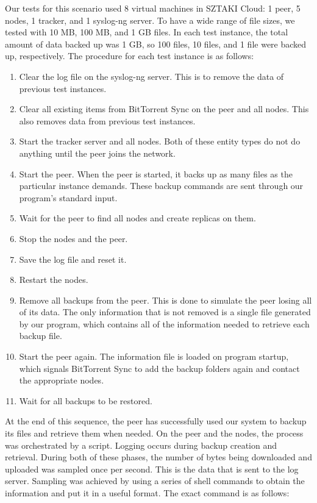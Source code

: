 \documentclass[12pt]{report}
\begin{document}
Our tests for this scenario used 8 virtual machines in SZTAKI Cloud: 1 peer, 5 nodes, 1 tracker, and 1 syslog-ng server. To have a wide range of file sizes, we tested with 10 MB, 100 MB, and 1 GB files. In each test instance, the total amount of data backed up was 1 GB, so 100 files, 10 files, and 1 file were backed up, respectively. The procedure for each test instance is as follows:

\begin{enumerate}
  \item Clear the log file on the syslog-ng server. This is to remove the data of previous test instances.
  \item Clear all existing items from BitTorrent Sync on the peer and all nodes. This also removes data from previous test instances.
  \item Start the tracker server and all nodes. Both of these entity types do not do anything until the peer joins the network.
  \item Start the peer. When the peer is started, it backs up as many files as the particular instance demands. These backup commands are sent through our program's standard input.
  \item Wait for the peer to find all nodes and create replicas on them.
  \item Stop the nodes and the peer.
  \item Save the log file and reset it.
  \item Restart the nodes.
  \item Remove all backups from the peer. This is done to simulate the peer losing all of its data. The only information that is not removed is a single file generated by our program, which contains all of the information needed to retrieve each backup file.
  \item Start the peer again. The information file is loaded on program startup, which signals BitTorrent Sync to add the backup folders again and contact the appropriate nodes.
  \item Wait for all backups to be restored.
\end{enumerate}

At the end of this sequence, the peer has successfully used our system to backup its files and retrieve them when needed. On the peer and the nodes, the process was orchestrated by a script. Logging occurs during backup creation and retrieval. During both of these phases, the number of bytes being downloaded and uploaded was sampled once per second. This is the data that is sent to the log server. Sampling was achieved by using a series of shell commands to obtain the information and put it in a useful format. The exact command is as follows:
\end{document}
